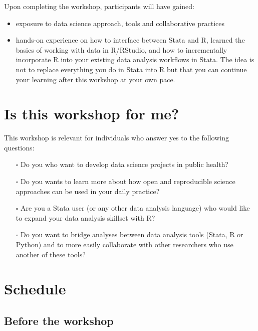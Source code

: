 \documentclass[
  letterpaper,
  DIV=11,
  numbers=noendperiod]{scrreprt}
\providecommand{\tightlist}{%
  \setlength{\itemsep}{0pt}\setlength{\parskip}{0pt}}\usepackage{longtable,booktabs,array}
\begin{document}
Upon completing the workshop, participants will have gained:

\begin{itemize}
\tightlist
\item
  exposure to data science approach, tools and collaborative practices
\item
  hands-on experience on how to interface between Stata and R, learned
  the basics of working with data in R/RStudio, and how to incrementally
  incorporate R into your existing data analysis workflows in Stata. The
  idea is not to replace everything you do in Stata into R but that you
  can continue your learning after this workshop at your own pace.
\end{itemize}

\hypertarget{is-this-workshop-for-me}{%
\section{Is this workshop for me?}\label{is-this-workshop-for-me}}

This workshop is relevant for individuals who answer yes to the
following questions:

\begin{itemize}
\tightlist
\item[$\square$]
  Do you who want to develop data science projects in public health?
\item[$\square$]
  Do you wants to learn more about how open and reproducible science
  approaches can be used in your daily practice?
\item[$\square$]
  Are you a Stata user (or any other data analysis language) who would
  like to expand your data analysis skillset with R?
\item[$\square$]
  Do you want to bridge analyses between data analysis tools (Stata, R
  or Python) and to more easily collaborate with other researchers who
  use another of these tools?
\end{itemize}

\hypertarget{schedule}{%
\section{Schedule}\label{schedule}}

\hypertarget{before-the-workshop}{%
\subsection{Before the workshop}\label{before-the-workshop}}
\end{document}
